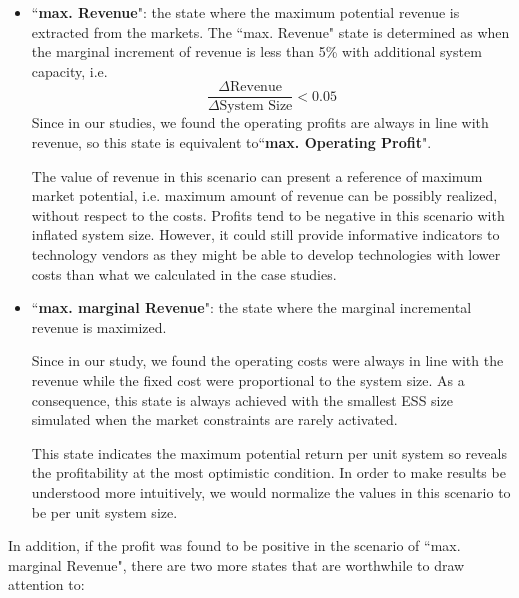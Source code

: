 \begin{itemize}
	\item ``\textbf{max. Revenue}": the state where the maximum potential revenue is extracted from the markets. The ``max. Revenue" state is determined as when the marginal increment of revenue is less than 5\% with additional system capacity, i.e. 
	\begin{equation*}
	\frac{\Delta\text{Revenue}}{\Delta\text{System Size}} < 0.05
	\end{equation*}
	Since in our studies, we found the operating profits are always in line with revenue, so this state is equivalent to``\textbf{max. Operating Profit}".
	
	The value of revenue in this scenario can present a reference of maximum market potential, i.e. maximum amount of revenue can be possibly realized, without respect to the costs. Profits tend to be negative in this scenario with inflated system size. However, it could still provide informative indicators to technology vendors as they might be able to develop technologies with lower costs than what we calculated in the case studies. 
	
	\item ``\textbf{max. marginal Revenue}": the state where the marginal incremental revenue is maximized.
	
	Since in our study, we found the operating costs were always in line with the revenue while the fixed cost were proportional to the system size. As a consequence, this state is always achieved with the smallest ESS size simulated when the market constraints are rarely activated.
	
	This state indicates the maximum potential return per unit system so reveals the profitability at the most optimistic condition. In order to make results be understood more intuitively, we would normalize the values in this scenario to be per unit system size. 
\end{itemize}

In addition, if the profit was found to be positive in the scenario of ``max. marginal Revenue", there are two more states that are worthwhile to draw attention to:

